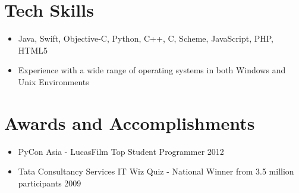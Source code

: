 \documentclass[11pt,a4paper]{moderncv}
\begin{document}
\section{Tech Skills}
\begin{itemize}
\item Java, Swift, Objective-C, Python, C++, C, Scheme, JavaScript, PHP, HTML5
\item Experience with a wide range of operating systems in both Windows and Unix Environments
\end{itemize}
\pagebreak
\section{Awards and Accomplishments}
\begin{itemize}
    \item PyCon Asia - LucasFilm Top Student Programmer                                         \hfill 2012
    \item Tata Consultancy Services IT Wiz Quiz - National Winner from 3.5 million participants \hfill 2009
\end{itemize}
\end{document}
